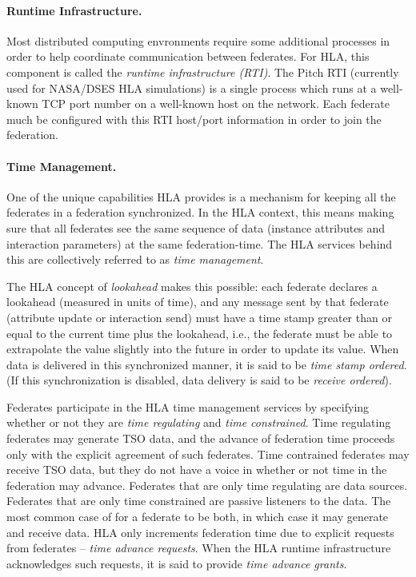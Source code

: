 \paragraph{Runtime Infrastructure.}
Most distributed computing envronments require some additional
processes in order to help coordinate communication between federates.
For HLA, this component is called the
{\em runtime infrastructure (RTI)}.
The Pitch RTI
(currently used for NASA/DSES HLA simulations)
is a single process which runs at a well-known TCP port number
on a well-known host on the network.
Each federate much be configured with this RTI host/port information
in order to join the federation.

\paragraph{Time Management.}
One of the unique capabilities HLA provides is a mechanism for keeping
all the federates in a federation synchronized.
In the HLA context, this means making sure that all federates see the
same sequence of data (instance attributes and interaction parameters)
at the same federation-time.
The HLA services behind this are collectively
referred to as {\em time management}.

The HLA concept of {\em lookahead} makes this possible:
each federate declares a lookahead (measured in units of time),
and any message sent by that federate (attribute update or interaction send)
must have a time stamp greater than or equal to the current time
plus the lookahead, i.e., the federate must be able to extrapolate the
value slightly into the future in order to update its value.
When data is delivered in this synchronized manner, it is said to be
{\em time stamp ordered}.
(If this synchronization is disabled, data delivery is said to be
{\em receive ordered}).

Federates participate in the HLA time management services by specifying
whether or not they are {\em time regulating} and {\em time constrained}.
Time regulating federates may generate TSO data, and the advance of
federation time proceeds only with the explicit agreement of such federates.
Time contrained federates may receive TSO data, but they do not have a voice
in whether or not time in the federation may advance.
Federates that are only time regulating are data sources.
Federates that are only time constrained are passive listeners to the data.
The most common case of for a federate to be both, in which case it may
generate and receive data.
HLA only increments federation time due to explicit requests from
federates -- {\em time advance requests}.
When the HLA runtime infrastructure acknowledges such requests, it is said
to provide {\em time advance grants}.



